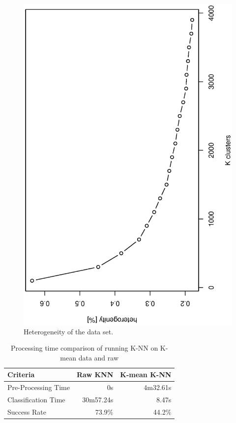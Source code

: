 \begin{figure}
\centering
\includegraphics[width=\textwidth]{graphics/heterogenity}
\caption{Heterogeneity of the data set.}
\label{fig:heterogeneity_kmean}
\end{figure}

\begin{table}[H]
\centering
\begin{tabular}{|l|r|r|}\hline
Criteria & Raw KNN & K-mean K-NN \\ \hline
Pre-Processing Time & 0s & 4m32.61s \\ \hline
Classification Time & 30m57.24s & 8.47s \\ \hline
Success Rate & 73.9\% & 44.2\% \\ \hline
\end{tabular}
\caption{Processing time comparison of running K-NN on K-mean data and raw}
\label{tab:processingtime_kmean_vs_raw_knn}
\end{table}